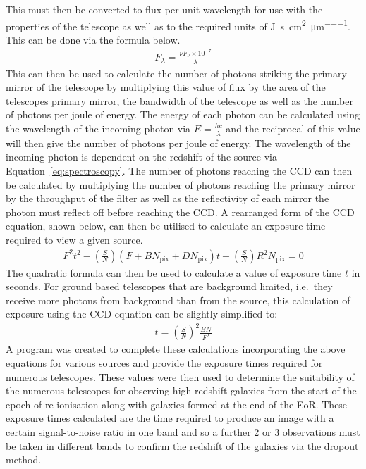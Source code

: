 		This must then be converted to flux per unit wavelength for use with the properties of the telescope as well as to the required units of \si{\joule\per\second\per\square\centi\metre\per\micro\metre}. This can be done via the formula below. %
		\begin{align}
			F_\lambda = \frac{\nu F_\nu \times 10^{-7}}{\lambda} \label{eq:flux_per_unit_frequency}
		\end{align}
		This can then be used to calculate the number of photons striking the primary mirror of the telescope by multiplying this value of flux by the area of the telescopes primary mirror, the bandwidth of the telescope as well as the number of photons per joule of energy. The energy of each photon can be calculated using the wavelength of the incoming photon via $E = \frac{hc}{\lambda}$ and the reciprocal of this value will then give the number of photons per joule of energy. The wavelength of the incoming photon is dependent on the redshift of the source via Equation~\ref{eq:spectroscopy}. The number of photons reaching the CCD can then be calculated by multiplying the number of photons reaching the primary mirror by the throughput of the filter as well as the reflectivity of each mirror the photon must reflect off before reaching the CCD. A rearranged form of the CCD equation, shown below, can then be utilised to calculate an exposure time required to view a given source.
		\begin{align}
			F^2 t^2 - (\frac{S}{N})(F + BN_\text{pix} + DN_\text{pix})t - (\frac{S}{N})R{^2}N_\text{pix} = 0
		\end{align}
		The quadratic formula can then be used to calculate a value of exposure time $t$ in seconds. For ground based telescopes that are background limited, i.e.\ they receive more photons from background than from the source, this calculation of exposure using the CCD equation can be slightly simplified to:
		\begin{align}
			t = (\frac{S}{N})^2 \frac{BN}{F^2}
		\end{align}
		A program was created to complete these calculations incorporating the above equations for various sources and provide the exposure times required for numerous telescopes. These values were then used to determine the suitability of the numerous telescopes for observing high redshift galaxies from the start of the epoch of re-ionisation along with galaxies formed at the end of the EoR. These exposure times calculated are the time required to produce an image with a certain signal-to-noise ratio in one band and so a further 2 or 3 observations must be taken in different bands to confirm the redshift of the galaxies via the dropout method.

